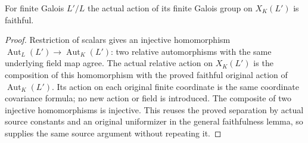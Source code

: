 \begin{lemma}
\label{fw:finite-norm-field-faithful}
\leanok
For finite Galois $L'/L$ the actual action of its finite Galois group
on $X_K(L')$ is faithful.
\end{lemma}
\begin{proof}
Restriction of scalars gives an injective homomorphism
$\operatorname{Aut}_L(L')\to\operatorname{Aut}_K(L')$:
two relative automorphisms with the same underlying field map agree.
The actual relative action on $X_K(L')$ is the composition of this
homomorphism with the proved faithful original action of
$\operatorname{Aut}_K(L')$. Its action on each original finite
coordinate is the same coordinate covariance formula; no new action
or field is introduced. The composite of two injective homomorphisms
is injective. This reuses the proved separation by actual source
constants and an original uniformizer in the general faithfulness
lemma, so supplies the same source argument without repeating it.
\end{proof}

